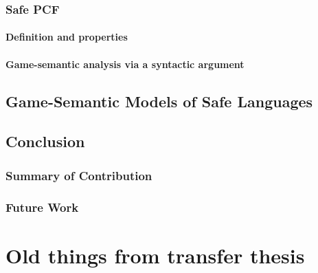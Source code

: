     \section{Safe PCF}
        \subsection{Definition and properties}
        \subsection{Game-semantic analysis via a syntactic argument}

    


\chapter{Game-Semantic Models of Safe Languages}

    



\chapter{Conclusion}
    \section{Summary of Contribution}
    \section{Future Work}


\part{Old things from transfer thesis}




    
    

         {\protect{}}


\bigsqcup%
